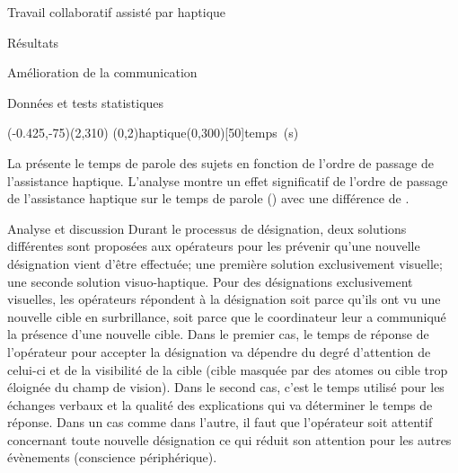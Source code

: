 \documentclass[myfrancais,ngerman,english,frenchb]{mythesis}
\begin{document}
\begin{mychapter}{Travail collaboratif assisté par haptique}
\begin{mysection}{Résultats}
\begin{mysubsection}{Amélioration de la communication}
\begin{mysubsubsection}{Données et tests statistiques}
					\begin{myfigure}
						\begin{myps}(-0.425,-75)(2,310)
							\myaxes(0,2){haptique}(0,300)[50]{temps~(s)}
						\end{myps}
					\end{myfigure}

					La  présente le temps de parole des sujets  en fonction de l'ordre de passage de l'assistance haptique.
					L'analyse montre un effet significatif de l'ordre de passage de l'assistance haptique sur le temps de parole  () avec une différence de .
				\end{mysubsubsection}
				\begin{mysubsubsection}{Analyse et discussion}
					Durant le processus de désignation, deux solutions différentes sont proposées aux opérateurs pour les prévenir qu'une nouvelle désignation vient d'être effectuée; une première solution exclusivement visuelle; une seconde solution visuo-haptique.
					Pour des désignations exclusivement visuelles, les opérateurs répondent à la désignation soit parce qu'ils ont vu une nouvelle cible en surbrillance, soit parce que le coordinateur leur a communiqué la présence d'une nouvelle cible.
					Dans le premier cas, le temps de réponse de l'opérateur pour accepter la désignation va dépendre du degré d'attention de celui-ci et de la visibilité de la cible (cible masquée par des atomes ou cible trop éloignée du champ de vision).
					Dans le second cas, c'est le temps utilisé pour les échanges verbaux et la qualité des explications qui va déterminer le temps de réponse.
					Dans un cas comme dans l'autre, il faut que l'opérateur soit attentif concernant toute nouvelle désignation ce qui réduit son attention pour les autres évènements (conscience périphérique).


\end{mysubsubsection}
\end{mysubsection}
\end{mysection}
\end{mychapter}
\end{document}
